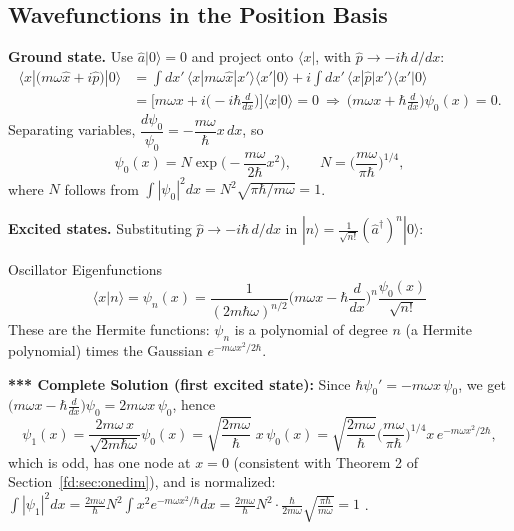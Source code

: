 \documentclass[11pt,a4paper]{article}
\begin{document}
\subsection{Wavefunctions in the Position Basis}
\textbf{Ground state.} Use $\hat a|0\rangle=0$ and project onto $\langle x|$, with $\hat p\to-i\hbar\,d/dx$:
\begin{align*}
\langle x|\big(m\omega\hat x+i\hat p\big)|0\rangle&=\int dx'\,\langle x|m\omega\hat x|x'\rangle\langle x'|0\rangle+i\!\int dx'\,\langle x|\hat p|x'\rangle\langle x'|0\rangle\\
&=\Big[m\omega x+i\Big(-i\hbar\frac d{dx}\Big)\Big]\langle x|0\rangle=0
\ \Longrightarrow\ \Big(m\omega x+\hbar\frac d{dx}\Big)\psi_0(x)=0 .
\end{align*}
Separating variables, $\dfrac{d\psi_0}{\psi_0}=-\dfrac{m\omega}\hbar x\,dx$, so
\[
\psi_0(x)=N\exp\Big(-\frac{m\omega}{2\hbar}x^2\Big),\qquad N=\Big(\frac{m\omega}{\pi\hbar}\Big)^{1/4},
\]
where $N$ follows from $\int|\psi_0|^2dx=N^2\sqrt{\pi\hbar/m\omega}=1$.

\textbf{Excited states.} Substituting $\hat p\to-i\hbar\,d/dx$ in $|n\rangle=\frac1{\sqrt{n!}}(\hat a^\dagger)^n|0\rangle$:
\begin{thm}{Oscillator Eigenfunctions}
\[
\langle x|n\rangle=\psi_n(x)=\frac1{(2m\hbar\omega)^{n/2}}\Big(m\omega x-\hbar\frac d{dx}\Big)^n\frac{\psi_0(x)}{\sqrt{n!}}
\]
These are the Hermite functions: $\psi_n$ is a polynomial of degree $n$ (a Hermite polynomial) times the Gaussian $e^{-m\omega x^2/2\hbar}$.
\end{thm}
\textbf{*** Complete Solution (first excited state):} Since $\hbar\psi_0'=-m\omega x\,\psi_0$, we get $\big(m\omega x-\hbar\frac d{dx}\big)\psi_0=2m\omega x\,\psi_0$, hence
\[
\psi_1(x)=\frac{2m\omega\,x}{\sqrt{2m\hbar\omega}}\psi_0(x)=\sqrt{\frac{2m\omega}\hbar}\;x\,\psi_0(x)=\sqrt{\frac{2m\omega}\hbar}\Big(\frac{m\omega}{\pi\hbar}\Big)^{1/4}x\,e^{-m\omega x^2/2\hbar},
\]
which is odd, has one node at $x=0$ (consistent with Theorem 2 of Section~\ref{fd:sec:onedim}), and is normalized: $\int|\psi_1|^2dx=\frac{2m\omega}\hbar N^2\int x^2e^{-m\omega x^2/\hbar}dx=\frac{2m\omega}\hbar N^2\cdot\frac{\hbar}{2m\omega}\sqrt{\frac{\pi\hbar}{m\omega}}=1$ \checkmark.
\end{document}
